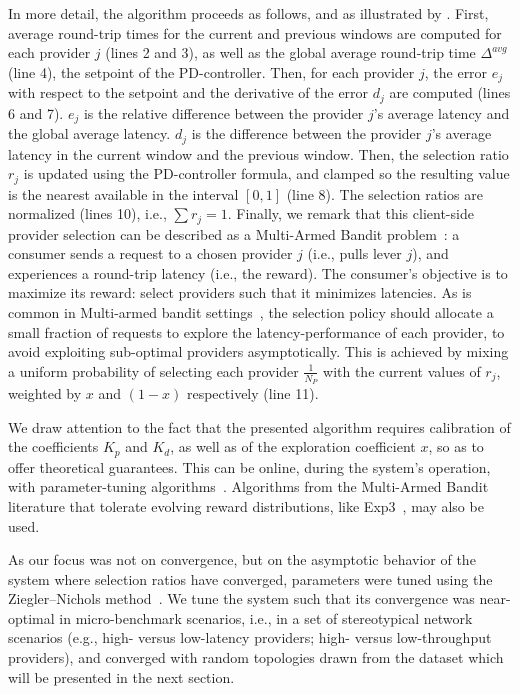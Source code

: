 In more detail, the algorithm proceeds as follows, and as illustrated by .
First, average round-trip times for the current and previous windows are computed for each provider $j$ (lines 2 and 3), as well as the global average round-trip time $\Delta^{avg}$ (line 4), the setpoint of the PD-controller.
Then, for each provider $j$, the error $e_{j}$ with respect to the setpoint and the derivative of the error $d_{j}$ are computed (lines 6 and 7).
$e_{j}$ is the relative difference between the provider $j$'s average latency and the global average latency. 
$d_{j}$ is the difference between the provider $j$'s average latency in the current window and the previous window.
Then, the selection ratio $r_{j}$ is updated using the PD-controller formula, and clamped so the resulting value is the nearest available in the interval $[0,1]$ (line 8).
The selection ratios are normalized (lines 10), i.e., $\sum r_{j} = 1$.
Finally, we remark that this client-side provider selection can be described as a Multi-Armed Bandit problem~\cite{slivkins2019introduction}: a consumer sends a request to a chosen provider $j$ (i.e., pulls lever $j$), and experiences a round-trip latency (i.e., the reward).
The consumer's objective is to maximize its reward: select providers such that it minimizes latencies. 
As is common in Multi-armed bandit settings~\cite{slivkins2019introduction}, the selection policy should allocate a small fraction of requests to explore the latency-performance of each provider, to avoid exploiting sub-optimal providers asymptotically.
This is achieved by mixing a uniform probability of selecting each provider $\frac{1}{N_{P}}$ with the current values of $r_{j}$, weighted by $x$ and $(1-x)$ respectively (line 11).

We draw attention to the fact that the presented algorithm requires calibration of the coefficients $K_{p}$ and $K_{d}$, as well as of the exploration coefficient $x$, so as to offer theoretical guarantees.
This can be online, during the system's operation, with parameter-tuning algorithms~\cite{fiducioso2019safe,xu2023config}. 
Algorithms from the Multi-Armed Bandit literature that tolerate evolving reward distributions, like Exp3~\cite{auer2002nonstochastic}, may also be used. 

As our focus was not on convergence, but on the asymptotic behavior of the system where selection ratios have converged, parameters were tuned using the Ziegler–Nichols method~\cite{ziegler1942optimum}.
We tune the system such that its convergence was near-optimal in micro-benchmark scenarios, i.e., in a set of stereotypical network scenarios (e.g., high- versus low-latency providers; high- versus low-throughput providers), and converged with random topologies drawn from the dataset which will be presented in the next section.
